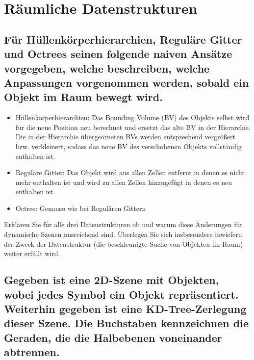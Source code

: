 \documentclass[a4paper,10pt,DIV=14]{article}
\begin{document}
\section{Räumliche Datenstrukturen}

\subsection{Für Hüllenkörperhierarchien, Reguläre Gitter und Octrees seinen folgende naiven Ansätze vorgegeben, welche beschreiben, welche Anpassungen vorgenommen werden, sobald ein Objekt im Raum bewegt wird.}

\begin{itemize}
	\item Hüllenkörperhierarchien: Das Bounding Volume (BV) des Objekts selbst wird für die neue Position neu berechnet und ersetzt das alte BV in der Hierarchie. Die in der Hierarchie übergeorneten BVs werden entsprechend vergrößert bzw. verkleinert, sodass das neue BV des verschobenen Objekts vollständig enthalten ist.
	\item Reguläre Gitter: Das Objekt wird aus allen Zellen entfernt in denen es nicht mehr enthalten ist und wird zu allen Zellen hinzugefügt in denen es neu enthalten ist.
	\item Octree: Genauso wie bei Regulären Gittern
\end{itemize}

Erklären Sie für alle drei Datenstrukturen ob und warum diese Änderungen für dynamische Szenen ausreichend sind. Überlegen Sie sich insbesondere inwiefern der Zweck der Datenstruktur (die beschleunigte Suche von Objekten im Raum) weiter erfüllt wird.

\subsection{Gegeben ist eine 2D-Szene mit Objekten, wobei jedes Symbol ein Objekt repräsentiert. Weiterhin gegeben ist eine KD-Tree-Zerlegung dieser Szene. Die Buchstaben kennzeichnen die Geraden, die die Halbebenen voneinander abtrennen.}
\end{document}
